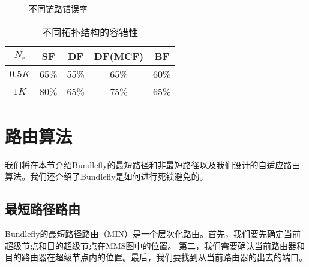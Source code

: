 \begin{figure}[t]
\setlength{\belowcaptionskip}{-.3cm}%
  \centering
 \begin{minipage}[t]{\textwidth}
   \centering
  \vspace{-.3cm}
  \caption{不同链路错误率}
  \label{r}
  \end{minipage}

\end{figure}

\begin{table}[t]
\caption{不同拓扑结构的容错性}
\centering
\begin{tabular}{c|c| c| c |c }\hline
  \centering
  $N_r$ & SF &DF &DF(MCF) &BF	\\\hline
  $0.5K$ &65\%  &55\%  &65\% &60\%\\
  $1K$	&80\%	&65\%  &75\% &65\% \\\hline
\end{tabular}
 \label{Table3}
\end{table}

\section{路由算法}
\label{routingalgorithm}

我们将在本节介绍Bundlefly的最短路径和非最短路径以及我们设计的自适应路由算法。我们还介绍了Bundlefly是如何进行死锁避免的。

\subsection{最短路径路由}

Bundlefly的最短路径路由（MIN）是一个层次化路由。首先，我们要先确定当前超级节点和目的超级节点在MMS图中的位置。
第二，我们需要确认当前路由器和目的路由器在超级节点内的位置。最后，我们要找到从当前路由器的出去的端口。

